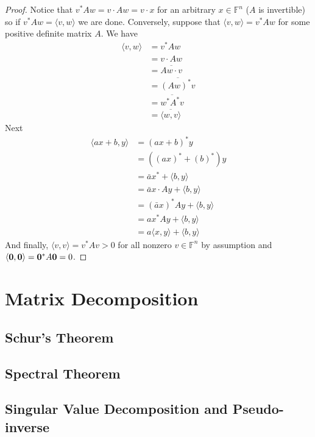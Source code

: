\documentclass[oneside, 12pt]{book}
\theoremstyle{definition}
\begin{document}
\begin{proof}
  Notice that $v^{*}Aw= v \cdot Aw=v \cdot x$ for an arbitrary $x \in \mathbb{F}^{n}$ ($A$ is invertible) so if $v^{*}Aw= \langle v, w \rangle$ we are done.
  Conversely, suppose that $\langle v, w \rangle = v^{*}Aw$ for some positive definite matrix $A$. We have
  \begin{align}
    \langle v , w \rangle &= v^{*}Aw \\
              &= v \cdot Aw \\
              &= \overline{Aw \cdot v} \\
              &= \overline{(Aw)^{*}v} \\
              &= \overline{w^{*}A^{*}v} \\
              &= \overline{\langle w , v \rangle}
  \end{align}
  Next
  \begin{align}
    \langle ax+b, y \rangle &= (ax+b)^{*}y \\
                &= ((ax)^{*}+ (b)^{*})y \\
                &= \bar{a}x^{*} + \langle b , y \rangle \\
                &= \bar{a}x \cdot Ay + \langle b , y \rangle \\
                &= (\bar{a}x)^{*}Ay + \langle b , y \rangle \\
                &= ax^{*}Ay + \langle b , y \rangle \\
                &=a \langle x, y \rangle + \langle b , y \rangle
  \end{align}
And finally, $\langle v , v \rangle=v^{*}Av>0$ for all nonzero $v \in \mathbb{F}^{n}$ by assumption and $\langle \bold{0}, \bold{0} \rangle=\bold{0}^{*}A\bold{0}=0$.
\end{proof}
\chapter{Matrix Decomposition}
\section{Schur's Theorem}
\section{Spectral Theorem}
\section{Singular Value Decomposition and Pseudo-inverse}
\end{document}
